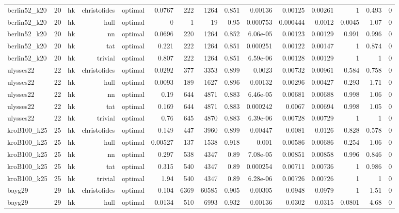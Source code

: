 \begin{tabular}{lrrrrrrrrrrrrrr}
berlin52\_k20 & 20 & hk & christofides & optimal & 0.0767 & 222 & 1264 & 0.851 & 0.00136 & 0.00125 & 0.00261 & 1 & 0.493 & 0 \\
berlin52\_k20 & 20 & hk & hull & optimal & 0 & 1 & 19 & 0.95 & 0.000753 & 0.000444 & 0.0012 & 0.0045 & 1.07 & 0 \\
berlin52\_k20 & 20 & hk & nn & optimal & 0.0696 & 220 & 1264 & 0.852 & 6.06e-05 & 0.00123 & 0.00129 & 0.991 & 0.996 & 0 \\
berlin52\_k20 & 20 & hk & tat & optimal & 0.221 & 222 & 1264 & 0.851 & 0.000251 & 0.00122 & 0.00147 & 1 & 0.874 & 0 \\
berlin52\_k20 & 20 & hk & trivial & optimal & 0.807 & 222 & 1264 & 0.851 & 6.59e-06 & 0.00128 & 0.00129 & 1 & 1 & 0 \\
ulysses22 & 22 & hk & christofides & optimal & 0.0292 & 377 & 3353 & 0.899 & 0.0023 & 0.00732 & 0.00961 & 0.584 & 0.758 & 0 \\
ulysses22 & 22 & hk & hull & optimal & 0.0093 & 189 & 1627 & 0.896 & 0.00132 & 0.00296 & 0.00427 & 0.293 & 1.71 & 0 \\
ulysses22 & 22 & hk & nn & optimal & 0.19 & 644 & 4871 & 0.883 & 6.46e-05 & 0.00681 & 0.00688 & 0.998 & 1.06 & 0 \\
ulysses22 & 22 & hk & tat & optimal & 0.169 & 644 & 4871 & 0.883 & 0.000242 & 0.0067 & 0.00694 & 0.998 & 1.05 & 0 \\
ulysses22 & 22 & hk & trivial & optimal & 0.76 & 645 & 4870 & 0.883 & 6.39e-06 & 0.00728 & 0.00729 & 1 & 1 & 0 \\
kroB100\_k25 & 25 & hk & christofides & optimal & 0.149 & 447 & 3960 & 0.899 & 0.00447 & 0.0081 & 0.0126 & 0.828 & 0.578 & 0 \\
kroB100\_k25 & 25 & hk & hull & optimal & 0.00527 & 137 & 1538 & 0.918 & 0.001 & 0.00586 & 0.00686 & 0.254 & 1.06 & 0 \\
kroB100\_k25 & 25 & hk & nn & optimal & 0.297 & 538 & 4347 & 0.89 & 7.08e-05 & 0.00851 & 0.00858 & 0.996 & 0.846 & 0 \\
kroB100\_k25 & 25 & hk & tat & optimal & 0.315 & 540 & 4347 & 0.89 & 0.000254 & 0.00711 & 0.00736 & 1 & 0.986 & 0 \\
kroB100\_k25 & 25 & hk & trivial & optimal & 1.94 & 540 & 4347 & 0.89 & 6.28e-06 & 0.00726 & 0.00726 & 1 & 1 & 0 \\
bayg29 & 29 & hk & christofides & optimal & 0.104 & 6369 & 60585 & 0.905 & 0.00305 & 0.0948 & 0.0979 & 1 & 1.51 & 0 \\
bayg29 & 29 & hk & hull & optimal & 0.0134 & 510 & 6993 & 0.932 & 0.00136 & 0.0302 & 0.0315 & 0.0801 & 4.68 & 0 \\

\end{tabular}
